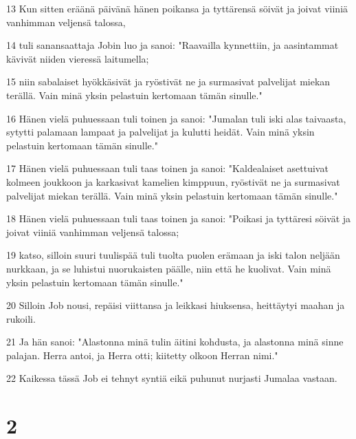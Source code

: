 \par 13 Kun sitten eräänä päivänä hänen poikansa ja tyttärensä söivät ja joivat viiniä vanhimman veljensä talossa,
\par 14 tuli sanansaattaja Jobin luo ja sanoi: "Raavailla kynnettiin, ja aasintammat kävivät niiden vieressä laitumella;
\par 15 niin sabalaiset hyökkäsivät ja ryöstivät ne ja surmasivat palvelijat miekan terällä. Vain minä yksin pelastuin kertomaan tämän sinulle."
\par 16 Hänen vielä puhuessaan tuli toinen ja sanoi: "Jumalan tuli iski alas taivaasta, sytytti palamaan lampaat ja palvelijat ja kulutti heidät. Vain minä yksin pelastuin kertomaan tämän sinulle."
\par 17 Hänen vielä puhuessaan tuli taas toinen ja sanoi: "Kaldealaiset asettuivat kolmeen joukkoon ja karkasivat kamelien kimppuun, ryöstivät ne ja surmasivat palvelijat miekan terällä. Vain minä yksin pelastuin kertomaan tämän sinulle."
\par 18 Hänen vielä puhuessaan tuli taas toinen ja sanoi: "Poikasi ja tyttäresi söivät ja joivat viiniä vanhimman veljensä talossa;
\par 19 katso, silloin suuri tuulispää tuli tuolta puolen erämaan ja iski talon neljään nurkkaan, ja se luhistui nuorukaisten päälle, niin että he kuolivat. Vain minä yksin pelastuin kertomaan tämän sinulle."
\par 20 Silloin Job nousi, repäisi viittansa ja leikkasi hiuksensa, heittäytyi maahan ja rukoili.
\par 21 Ja hän sanoi: "Alastonna minä tulin äitini kohdusta, ja alastonna minä sinne palajan. Herra antoi, ja Herra otti; kiitetty olkoon Herran nimi."
\par 22 Kaikessa tässä Job ei tehnyt syntiä eikä puhunut nurjasti Jumalaa vastaan.

\chapter{2}


